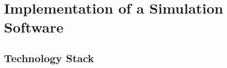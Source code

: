 %
%
%
%
%
%
%


\section{Implementation of a Simulation Software} \label{sec:implementation}

\subsection{Technology Stack} \label{sec:tech-stack}



